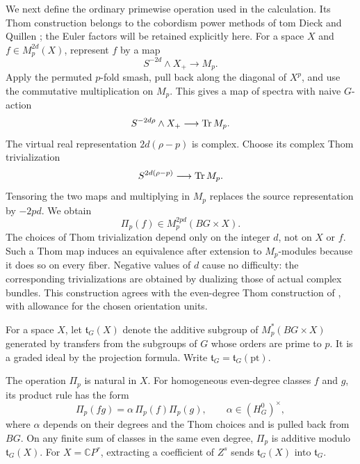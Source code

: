We next define the ordinary primewise operation used in the
calculation. Its Thom construction belongs to the cobordism power
methods of tom Dieck and Quillen
\cite{tomDieck1968,Quillen1971}; the Euler factors will be retained
explicitly here. For a space $X$ and $f\in M_p^{2d}(X)$, represent $f$ by
a map
\[
 S^{-2d}\wedge X_+\longrightarrow M_p.
\]
Apply the permuted $p$-fold smash, pull back along the diagonal of
$X^p$, and use the commutative multiplication on $M_p$.  This gives a
map of spectra with naive $G$-action
\[
 S^{-2d\rho}\wedge X_+\longrightarrow\operatorname{Tr} M_p.
\]
The virtual real representation $2d(\rho-p)$ is complex.  Choose its
complex Thom trivialization
\[
 S^{2d(\rho-p)}\longrightarrow\operatorname{Tr} M_p.
\]
Tensoring the two maps and multiplying in $M_p$ replaces the source
representation by $-2pd$.  We obtain
\begin{equation}
 \label{cob:pi-definition}
 \Pi_p(f)\in M_p^{2pd}(BG\times X).
\end{equation}
The choices of Thom trivialization depend only on the integer $d$,
not on $X$ or $f$.  Such a Thom map induces an equivalence after
extension to $M_p$-modules because it does so on every fiber.  Negative
values of $d$ cause no difficulty: the corresponding trivializations
are obtained by dualizing those of actual complex bundles.  This
construction agrees with the even-degree Thom construction of
\cite[Section~3.2]{JohnsonNoel2010}, with allowance for the chosen
orientation units.

For a space $X$, let $\mathfrak t_G(X)$ denote the additive subgroup of
$M_p^*(BG\times X)$ generated by transfers from the subgroups of $G$
whose orders are prime to $p$.  It is a graded ideal by the projection
formula.  Write $\mathfrak t_G=\mathfrak t_G(\mathrm{pt})$.

\begin{lemma}
 \label{cob:power-rules}
 The operation $\Pi_p$ is natural in $X$.  For homogeneous even-degree
 classes $f$ and $g$, its product rule has the form
 \[
  \Pi_p(fg)=\alpha\,\Pi_p(f)\Pi_p(g),
  \qquad \alpha\in(H_G^0)^\times,
 \]
 where $\alpha$ depends on their degrees and the Thom choices and is
 pulled back from $BG$.  On any finite sum of classes in the same
 even degree, $\Pi_p$ is additive modulo $\mathfrak t_G(X)$.
 For $X=\mathbb CP^r$, extracting a coefficient of $Z^s$ sends
 $\mathfrak t_G(X)$ into $\mathfrak t_G$.
\end{lemma}

